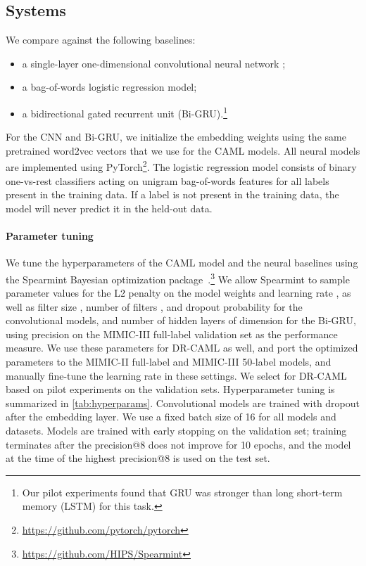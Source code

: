 \documentclass[11pt,a4paper]{article}
\newcommand{\pate}{precision}
\begin{document}
\subsection{Systems}
We compare against the following baselines:
\begin{itemize}
\item a single-layer one-dimensional convolutional neural network \cite{kim2014convolutional};
\item a bag-of-words logistic regression model;
\item a bidirectional gated recurrent unit (Bi-GRU).\footnote{Our pilot experiments found that GRU was stronger than long short-term memory (LSTM) for this task.}
\end{itemize}
For the CNN and Bi-GRU, we initialize the embedding weights using the same pretrained word2vec vectors that we use for the CAML models. All neural models are implemented using PyTorch\footnote{\url{https://github.com/pytorch/pytorch}}. The logistic regression model consists of  binary one-vs-rest classifiers acting on unigram bag-of-words features for all labels present in the training data. If a label is not present in the training data, the model will never predict it in the held-out data. 

\paragraph{Parameter tuning}
We tune the hyperparameters of the CAML model and the neural baselines using the Spearmint Bayesian optimization package~\citep{NIPS2012_4522, NIPS2013_5086}.\footnote{\url{https://github.com/HIPS/Spearmint}}
We allow Spearmint to sample parameter values for the L2 penalty on the model weights  and learning rate , as well as filter size , number of filters , and dropout probability  for the convolutional models, and number of hidden layers  of dimension  for the Bi-GRU, using \pate{} on the MIMIC-III full-label validation set as the performance measure. We use these parameters for DR-CAML as well, and port the optimized parameters to the MIMIC-II full-label and MIMIC-III 50-label models, and manually fine-tune the learning rate in these settings. We select  for DR-CAML based on pilot experiments on the validation sets. Hyperparameter tuning is summarized in \autoref{tab:hyperparams}.
Convolutional models are trained with dropout after the embedding layer. We use a fixed batch size of 16 for all models and datasets. Models are trained with early stopping on the validation set; training terminates after the precision@8 does not improve for 10 epochs, and the model at the time of the highest precision@8 is used on the test set. 
\end{document}
